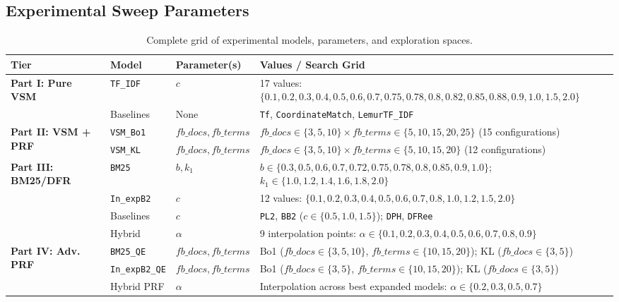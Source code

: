 \documentclass[10pt, a4paper]{article}
\begin{document}
\subsection{Experimental Sweep Parameters}
\begin{table}[H]
\centering
\small
\begin{tabular}{@{}lllp{7cm}@{}}
\toprule
\textbf{Tier} & \textbf{Model} & \textbf{Parameter(s)} & \textbf{Values / Search Grid} \\ \midrule
\multirow{2}{*}{\textbf{Part I: Pure VSM}} & \texttt{TF\_IDF} & $c$ & 17 values: $\{0.1, 0.2, 0.3, 0.4, 0.5, 0.6, 0.7, 0.75, 0.78, 0.8, 0.82, 0.85, 0.88, 0.9, 1.0, 1.5, 2.0\}$ \\
& Baselines & None & \texttt{Tf}, \texttt{CoordinateMatch}, \texttt{LemurTF\_IDF} \\ \midrule
\multirow{2}{*}{\textbf{Part II: VSM + PRF}} & \texttt{VSM\_Bo1} & $fb\_docs, fb\_terms$ & $fb\_docs \in \{3, 5, 10\} \times fb\_terms \in \{5, 10, 15, 20, 25\}$ (15 configurations) \\
& \texttt{VSM\_KL} & $fb\_docs, fb\_terms$ & $fb\_docs \in \{3, 5, 10\} \times fb\_terms \in \{5, 10, 15, 20\}$ (12 configurations) \\ \midrule
\multirow{4}{*}{\textbf{Part III: BM25/DFR}} & \texttt{BM25} & $b, k_1$ & $b \in \{0.3, 0.5, 0.6, 0.7, 0.72, 0.75, 0.78, 0.8, 0.85, 0.9, 1.0\}$; $k_1 \in \{1.0, 1.2, 1.4, 1.6, 1.8, 2.0\}$ \\
& \texttt{In\_expB2} & $c$ & 12 values: $\{0.1, 0.2, 0.3, 0.4, 0.5, 0.6, 0.7, 0.8, 1.0, 1.2, 1.5, 2.0\}$ \\
& Baselines & $c$ & \texttt{PL2}, \texttt{BB2} ($c \in \{0.5, 1.0, 1.5\}$); \texttt{DPH}, \texttt{DFRee} \\
& Hybrid & $\alpha$ & 9 interpolation points: $\alpha \in \{0.1, 0.2, 0.3, 0.4, 0.5, 0.6, 0.7, 0.8, 0.9\}$ \\ \midrule
\multirow{2}{*}{\textbf{Part IV: Adv. PRF}} & \texttt{BM25\_QE} & $fb\_docs, fb\_terms$ & Bo1 ($fb\_docs \in \{3, 5, 10\}$, $fb\_terms \in \{10, 15, 20\}$); KL ($fb\_docs \in \{3, 5\}$) \\
& \texttt{In\_expB2\_QE} & $fb\_docs, fb\_terms$ & Bo1 ($fb\_docs \in \{3, 5\}$, $fb\_terms \in \{10, 15, 20\}$); KL ($fb\_docs \in \{3, 5\}$) \\
& Hybrid PRF & $\alpha$ & Interpolation across best expanded models: $\alpha \in \{0.2, 0.3, 0.5, 0.7\}$ \\ \bottomrule
\end{tabular}
\caption{Complete grid of experimental models, parameters, and exploration spaces.}
\label{tab:exp_plan}
\end{table}
\end{document}
